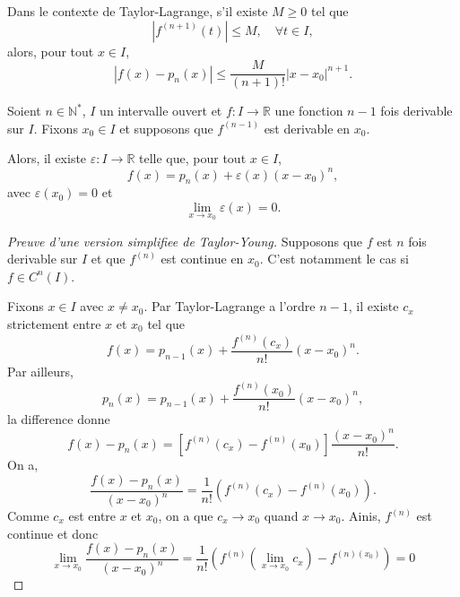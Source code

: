 \begin{corollary}
Dans le contexte de Taylor-Lagrange, s'il existe $M\ge 0$ tel que
$$
	|f^{(n+1)}(t)|\le M,\quad \forall t\in I,
$$
alors, pour tout $x \in I$, 
$$
|f(x)-p_{n}(x)|\le \frac{M}{(n+1)!}|x-x_{0}|^{n+1}.
$$
\end{corollary}
\begin{theorem}
Soient $n\in \mathbb{N}^{*}$, $I$ un intervalle ouvert et $f:I\to \mathbb{R}$ une fonction $n-1$ fois derivable sur $I$. Fixons $x_{0}\in I$ et supposons que $f^{(n-1)}$ est derivable en $x_{0}$.

Alors, il existe $\varepsilon:I\to \mathbb{R}$ telle que, pour tout $x \in I$,
$$
f(x)=p_{n}(x)+\varepsilon(x)(x-x_{0})^{n},
$$
avec $\varepsilon(x_{0})=0$ et
$$
\lim_{ x \to x_{0} } \varepsilon(x)=0.
$$
\end{theorem}
\begin{proof}[Preuve d'une version simplifiee de Taylor-Young]
Supposons que $f$ est $n$ fois derivable sur $I$ et que $f^{(n)}$ est continue en $x_{0}$. C'est notamment le cas si $f\in C^{n}(I)$.

Fixons $x \in I$ avec $x\neq x_{0}$. Par Taylor-Lagrange a l'ordre $n-1$, il existe $c_{x}$ strictement entre $x$ et $x_{0}$ tel que
$$
f(x)=p_{n-1}(x)+\frac{f^{(n)}(c_{x})}{n!}(x-x_{0})^{n}.
$$
Par ailleurs,
$$
p_{n}(x)=p_{n-1}(x)+\frac{f^{(n)}(x_{0})}{n!}(x-x_{0})^{n},
$$
la difference donne
$$
f(x)-p_{n}(x)=[f^{(n)}(c_{x})-f^{(n)}(x_{0})] \frac{(x-x_{0})^{n}}{n!}.
$$
On a,
$$
\frac{f(x)-p_{n}(x)}{(x-x_{0})^{n}}=\frac{1}{n!}(f^{(n)}(c_{x})-f^{(n)}(x_{0})).
$$
Comme $c_{x}$ est entre $x$ et $x_{0}$, on a que $c_{x}\to x_{0}$ quand $x\to x_{0}$. Ainis, $f^{(n)}$ est continue et donc
$$
\lim_{ x \to x_{0} } \frac{f(x)-p_{n}(x)}{(x-x_{0})^{n}}=\frac{1}{n!}(f^{(n)}(\lim_{ x \to x_{0} } c_{x})-f^{(n)(x_{0})})=0 
$$
\end{proof}
